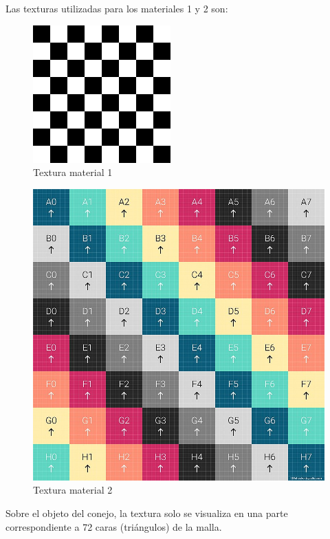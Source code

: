 \documentclass[12pt]{article}
\begin{document}
Las texturas utilizadas para los materiales 1 y 2 son:



\begin{figure}[H]
\centering
\includegraphics[scale=3]{images/textura2.png}
\caption{Textura material 1}
\end{figure}

\begin{figure}[H]
\centering
\includegraphics[scale=0.2]{images/textura1.jpg}
\caption{Textura material 2}
\end{figure}



Sobre el objeto del conejo, la textura solo se visualiza en una parte correspondiente a 72 caras (triángulos) de la malla.
\end{document}
